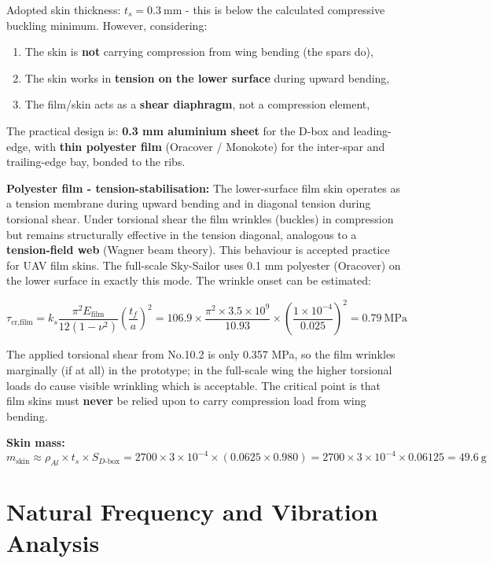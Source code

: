 \documentclass[10pt,a4paper]{article}
\begin{document}
Adopted skin thickness: $t_s = 0.3\ \text{mm}$ - this is below the calculated compressive buckling minimum. However, considering:
\begin{enumerate}[noitemsep,topsep=2pt]
\item The skin is \textbf{not} carrying compression from wing bending (the spars do),
\item The skin works in \textbf{tension on the lower surface} during upward bending,
\item The film/skin acts as a \textbf{shear diaphragm}, not a compression element,
\end{enumerate}

The practical design is: \textbf{0.3 mm aluminium sheet} for the D-box and leading-edge, with \textbf{thin polyester film} (Oracover / Monokote) for the inter-spar and trailing-edge bay, bonded to the ribs.

\textbf{Polyester film - tension-stabilisation:} The lower-surface film skin operates as a tension membrane during upward bending and in diagonal tension during torsional shear. Under torsional shear the film wrinkles (buckles) in compression but remains structurally effective in the tension diagonal, analogous to a \textbf{tension-field web} (Wagner beam theory). This behaviour is accepted practice for UAV film skins. The full-scale Sky-Sailor uses 0.1 mm polyester (Oracover) on the lower surface in exactly this mode. The wrinkle onset can be estimated:

\[
\tau_{\text{cr,film}} = k_s \frac{\pi^2 E_{\text{film}}}{12(1-\nu^2)}\left(\frac{t_f}{a}\right)^2 = 106.9 \times \frac{\pi^2 \times 3.5 \times 10^9}{10.93} \times \left(\frac{1 \times 10^{-4}}{0.025}\right)^2 = 0.79\ \text{MPa}
\]

The applied torsional shear from No.10.2 is only 0.357 MPa, so the film wrinkles marginally (if at all) in the prototype; in the full-scale wing the higher torsional loads do cause visible wrinkling which is acceptable. The critical point is that film skins must \textbf{never} be relied upon to carry compression load from wing bending.

\textbf{Skin mass:}
\[
m_{\text{skin}} \approx \rho_{Al} \times t_s \times S_{D\text{-box}} = 2700 \times 3 \times 10^{-4} \times (0.0625 \times 0.980) = 2700 \times 3 \times 10^{-4} \times 0.06125 = 49.6\ \text{g}
\]

\newpage \section{Natural Frequency and Vibration Analysis}
\end{document}
